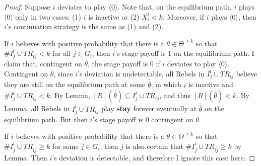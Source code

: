 \documentclass[12pt,letter]{article}
\theoremstyle{definition}
\theoremstyle{definition}
\theoremstyle{remark}
\theoremstyle{claim}
\begin{document}
\begin{proof}
Suppose $i$ deviates to play $\langle 0 \rangle$. Note that, on the equilibrium path, $i$ plays $\langle 0 \rangle$ only in two cases: (1) $i$ is inactive or (2) $X^t_i<k$. Moreover, if $i$ plays $\langle 0 \rangle$, then $i$'s continuation strategy is the same as (1) and (2).

If $i$ believes with positive probability that there is a $\bar{\theta}\in \Theta^{\geq k}$ so that $\#I^t_j\cup TR_{ij}< k$ for all $j\in G_i$, then $i$'s stage payoff is $1$ on the equilibrium path. I claim that, contingent on $\bar{\theta}$, the stage payoff is $0$ if $i$ deviates to play $\langle 0 \rangle$. Contingent on $\bar{\theta}$, since $i$'s deviation is undetectable, all Rebels in $I^t_j\cup TR_{ij}$ believe they are still on the equilibrium path at some $\bar{\bar{\theta}}$, in which $i$ is inactive and $\#I^t_j\cup TR_{ij}<k$. By Lemma, $[R](\bar{\bar{\theta}})\subseteq I^t_j\cup TR_{ij}$, and thus $[R](\bar{\bar{\theta}})<k$. By Lemma, all Rebels in $I^t_j\cup TR_{ij}$ play \textbf{stay} forever eventually at $\bar{\bar{\theta}}$ on the equilibrium path. But then $i$'s stage payoff is $0$ contingent on $\bar{\theta}$. 

If $i$ believes with positive probability that there is a $\bar{\theta}\in \Theta^{\geq k}$ so that $\#I^t_{\bar{j}}\cup TR_{i\bar{j}}\geq k$ for some $\bar{j}\in G_i$, then $\bar{j}$ is also certain that $\#I^t_{\bar{j}}\cup TR_{i\bar{j}}\geq k$ by Lemma. Then $i$'s deviation is detectable, and therefore I ignore this case here.

%
%




\end{proof}
\end{document}
